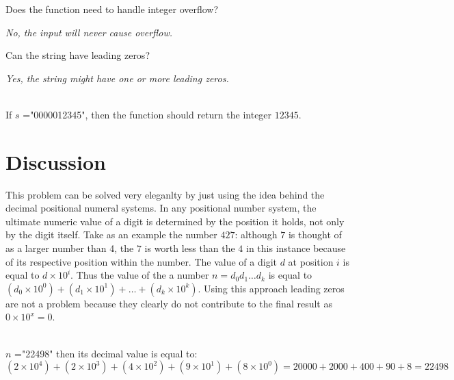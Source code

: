 \begin{QandA}
	\item \begin{questionitem} \begin{question} Does the function need to handle integer overflow?  \end{question} 	 
    \begin{answered}
		\textit{No, the input will never cause overflow.}
	\end{answered} \end{questionitem}

	\item \begin{questionitem} \begin{question} Can the string have leading zeros?  \end{question} 	 
    \begin{answered}
		\textit{Yes, the string might have one or more leading zeros.}
		\begin{example}
			\hfill \\
			If $s$ ="0000012345", then the function should return the integer $12345$.	
		\end{example}
	\end{answered} \end{questionitem}
	
\end{QandA}

\section{Discussion}
\label{string_to_int:sec:discussion}
This problem can be solved very eleganlty by just using the idea behind the decimal positional numeral systems.
In any positional number system, the ultimate numeric value of a digit is determined by the position it holds, not only by the digit itself. Take as an example the number $427$:  although $7$ is thought of as a larger number than 4, the $7$ is worth less than the $4$ in this instance because of its respective position within the number. The value of a digit $d$ at position $i$ is equal to $d\times 10^i$. Thus the value of the a number $n=d_0d_1 \ldots d_k$ is equal to $(d_0 \times 10^0) + (d_1 \times 10^1) + \ldots + (d_k \times 10^k)$.
Using this approach leading zeros are not a problem because they clearly do not contribute to the final result as $0 \times 10^x = 0$.
\begin{example}
	\hfill \\
	 $n$ ="22498" then its decimal value is equal to: $(2 \times 10^4) + (2 \times 10^3) + (4 \times 10^2) + (9 \times 10^1) + (8 \times 10^0) = 20000 + 2000 + 400 +90 +8 = 22498$
\end{example}

